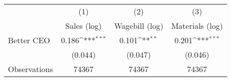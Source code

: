 {
\def\sym#1{\ifmmode^{#1}\else\(^{#1}\)\fi}
\begin{tabular}{l*{3}{c}}
\hline\hline
                    &\multicolumn{1}{c}{(1)}&\multicolumn{1}{c}{(2)}&\multicolumn{1}{c}{(3)}\\
                    &\multicolumn{1}{c}{Sales (log)}&\multicolumn{1}{c}{Wagebill (log)}&\multicolumn{1}{c}{Materials (log)}\\
\hline
Better CEO          &       0.186\sym{***}&       0.101\sym{**} &       0.201\sym{***}\\
                    &     (0.044)         &     (0.047)         &     (0.046)         \\
\hline
Observations        &       74367         &       74367         &       74367         \\
\hline\hline
\end{tabular}
}
